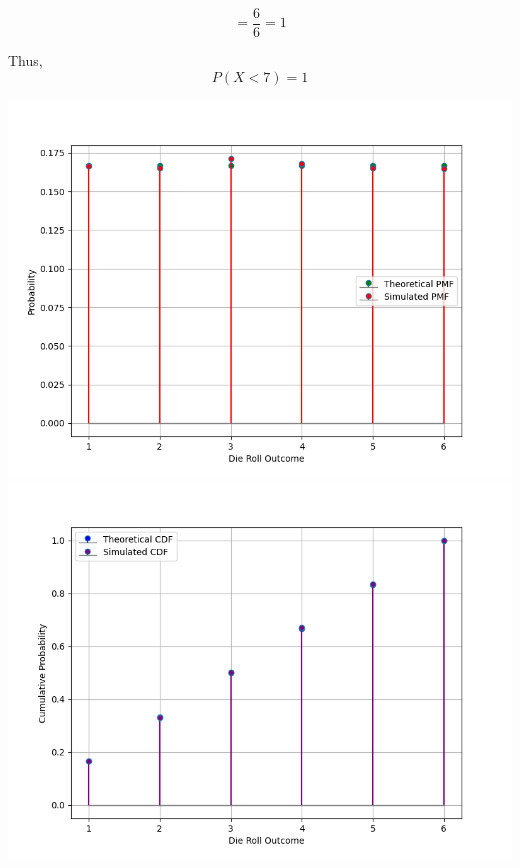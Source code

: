 \documentclass[journal]{IEEEtran}
\begin{document}
\[
= \frac{6}{6} = 1
\]

Thus,
\[
P(X < 7) = 1
\]

\includegraphics[width=\textwidth]{Figs/Figure_1.png}
\includegraphics[width=\textwidth]{Figs/Figure_2.png}
\end{document}
